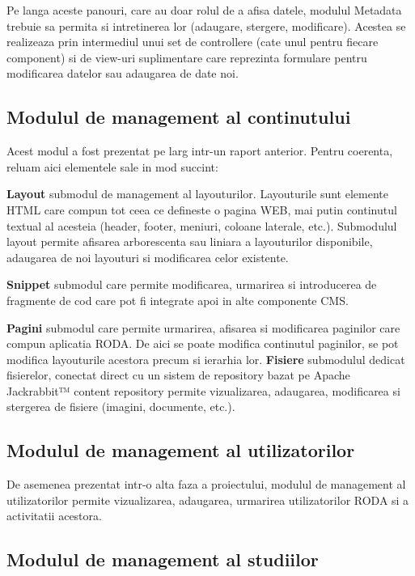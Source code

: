 Pe langa aceste panouri, care au doar rolul de a afisa datele, modulul Metadata trebuie sa permita si intretinerea lor (adaugare, stergere, modificare). Acestea se realizeaza prin intermediul unui set de controllere (cate unul pentru fiecare component) si de view-uri suplimentare care reprezinta formulare pentru modificarea datelor sau adaugarea de date noi. 


\subsection{Modulul de management al continutului}

Acest modul a fost prezentat pe larg intr-un raport anterior. Pentru coerenta, reluam aici elementele sale in mod succint:

\textbf{Layout} submodul de management al layouturilor. Layouturile sunt elemente HTML care compun tot ceea ce defineste o pagina WEB, mai putin continutul textual al acesteia (header, footer, meniuri, coloane laterale, etc.). Submodulul layout permite afisarea arborescenta sau liniara a layouturilor disponibile, adaugarea de noi layouturi si modificarea celor existente.

\textbf{Snippet} submodul care permite modificarea, urmarirea si introducerea de fragmente de cod care pot fi integrate apoi in alte componente CMS. 

\textbf{Pagini} submodul care permite urmarirea, afisarea si modificarea paginilor care compun aplicatia RODA. De aici se poate modifica continutul paginilor, se pot modifica layouturile acestora precum si ierarhia lor.
\textbf{Fisiere} submodulul dedicat fisierelor, conectat direct cu un sistem de repository bazat pe Apache Jackrabbit™ content repository permite vizualizarea, adaugarea, modificarea si stergerea de fisiere (imagini, documente, etc.).


\subsection{Modulul de management al utilizatorilor}

De asemenea prezentat intr-o alta faza a proiectului, modulul de management al utilizatorilor permite vizualizarea, adaugarea, urmarirea utilizatorilor RODA si a activitatii acestora. 


\subsection{Modulul de management al studiilor}

